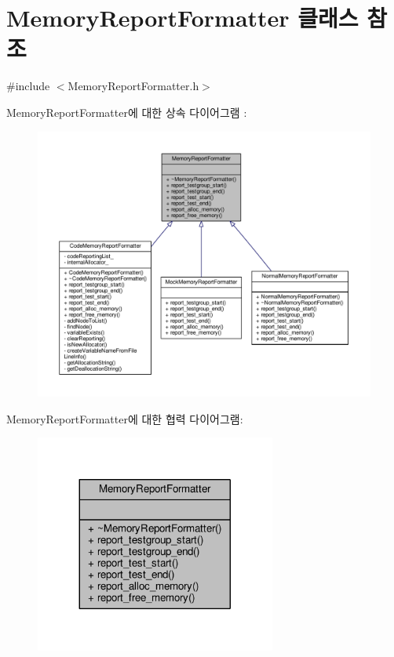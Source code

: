 \hypertarget{class_memory_report_formatter}{}\section{Memory\+Report\+Formatter 클래스 참조}
\label{class_memory_report_formatter}


{\ttfamily \#include $<$Memory\+Report\+Formatter.\+h$>$}



Memory\+Report\+Formatter에 대한 상속 다이어그램 \+: 
\nopagebreak
\begin{figure}[H]
\begin{center}
\leavevmode
\includegraphics[width=350pt]{class_memory_report_formatter__inherit__graph}
\end{center}
\end{figure}


Memory\+Report\+Formatter에 대한 협력 다이어그램\+:
\nopagebreak
\begin{figure}[H]
\begin{center}
\leavevmode
\includegraphics[width=224pt]{class_memory_report_formatter__coll__graph}
\end{center}
\end{figure}
